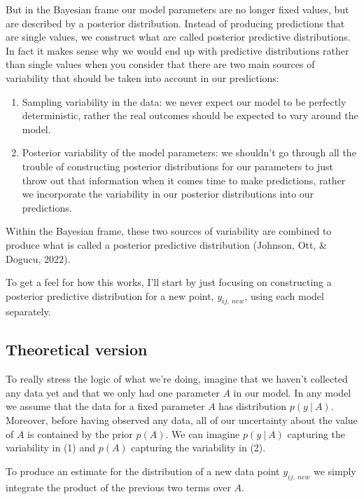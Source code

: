 \documentclass[12pt,twoside]{reedthesis}
\begin{document}
But in the Bayesian frame our model parameters are no longer fixed values, but are described by a posterior distribution. Instead of producing predictions that are single values, we construct what are called posterior predictive distributions. In fact it makes sense why we would end up with predictive distributions rather than single values when you consider that there are two main sources of variability that should be taken into account in our predictions:
\begin{enumerate}
\def\labelenumi{\arabic{enumi}.}
\item
  Sampling variability in the data: we never expect our model to be perfectly deterministic, rather the real outcomes should be expected to vary around the model.
\item
  Posterior variability of the model parameters: we shouldn't go through all the trouble of constructing posterior distributions for our parameters to just throw out that information when it comes time to make predictions, rather we incorporate the variability in our posterior distributions into our predictions.
\end{enumerate}
Within the Bayesian frame, these two sources of variability are combined to produce what is called a posterior predictive distribution (Johnson, Ott, \& Dogucu, 2022).

To get a feel for how this works, I'll start by just focusing on constructing a posterior predictive distribution for a new point, \(y_{ij, \ new}\), using each model separately.

\hypertarget{theoretical-version}{%
\subsection{Theoretical version}\label{theoretical-version}}

To really stress the logic of what we're doing, imagine that we haven't collected any data yet and that we only had one parameter \(A\) in our model. In any model we assume that the data for a fixed parameter \(A\) has distribution \(p(y \ | \ A)\). Moreover, before having observed any data, all of our uncertainty about the value of \(A\) is contained by the prior \(p(A)\). We can imagine \(p(y \ | \ A)\) capturing the variability in (1) and \(p(A)\) capturing the variability in (2).

To produce an estimate for the distribution of a new data point \(y_{ij, \ new}\) we simply integrate the product of the previous two terms over \(A\).
\end{document}
